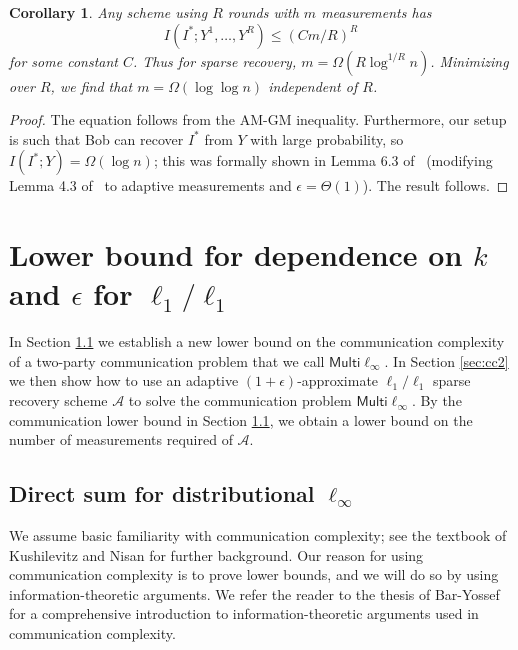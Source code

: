 \documentclass[twoside,leqno,twocolumn]{article}
\newtheorem{corollary}[theorem]{Corollary}
\newcommand{\multiLinf}{\mathsf{Multi}\ell_{\infty}}
\def\eps{\epsilon}
\begin{document}
\begin{corollary}
  Any scheme using $R$ rounds with $m$ measurements has
  \[
  I(I^*; Y^1, \dotsc, Y^R) \leq (Cm/R)^R
  \]
  for some constant $C$.  Thus for sparse recovery, $m =
  \Omega(R\log^{1/R} n)$.  Minimizing over $R$, we find that $m =
  \Omega(\log \log n)$ independent of $R$.
\end{corollary}
\begin{proof}
  The equation follows from the AM-GM inequality.  Furthermore, our
  setup is such that Bob can recover $I^*$ from $Y$ with large
  probability, so $I(I^*; Y) = \Omega(\log n)$; this was formally
  shown in Lemma 6.3 of~\cite{HIKP12} (modifying Lemma 4.3
  of~\cite{PW11} to adaptive measurements and $\eps = \Theta(1)$).
  The result follows.
\end{proof}


\section{Lower bound for dependence on $k$ and $\eps$ for $\ell_1/\ell_1$}
\label{sec:eps}
In Section
\ref{sec:cc1} we establish a new lower bound on the communication complexity
of a two-party communication problem that we call $\multiLinf$. 
In Section \ref{sec:cc2} we
then show how to use an adaptive $(1+\eps)$-approximate $\ell_1/\ell_1$ sparse
recovery scheme $\mathcal{A}$ 
to solve the communication problem $\multiLinf$. 
By the communication lower bound in Section \ref{sec:cc1}, 
we obtain a lower bound on the number of measurements required of $\mathcal{A}$. 

\subsection{Direct sum for distributional $\ell_{\infty}$}\label{sec:cc1}
We assume basic familiarity with communication complexity; see the
textbook of Kushilevitz and Nisan \cite{kn97} for further background.
Our reason for using communication complexity is to prove lower
bounds, and we will do so by using information-theoretic arguments. We
refer the reader to the thesis of Bar-Yossef \cite{BarYossefThesis}
for a comprehensive introduction to information-theoretic arguments
used in communication complexity.
\end{document}
